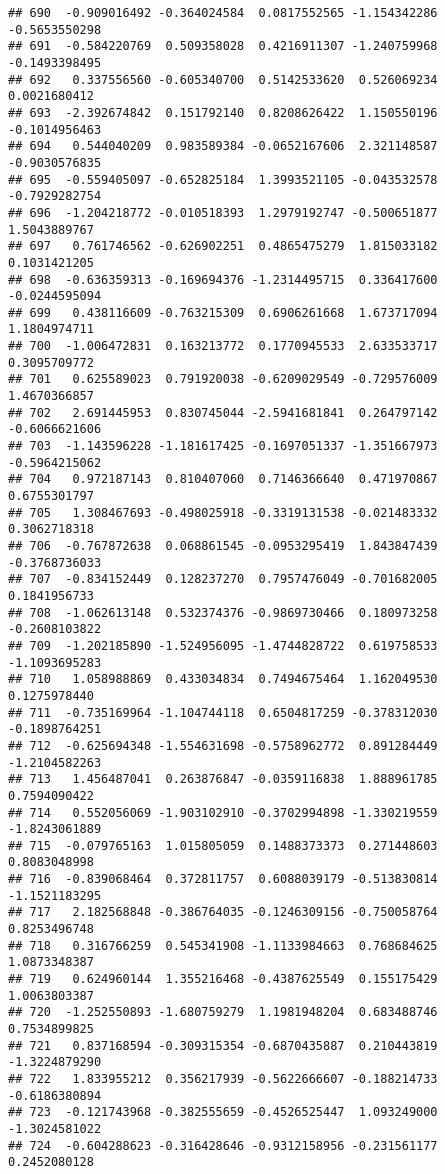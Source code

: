 \documentclass[
]{article}
\begin{document}
\begin{verbatim}
## 690  -0.909016492 -0.364024584  0.0817552565 -1.154342286 -0.5653550298
## 691  -0.584220769  0.509358028  0.4216911307 -1.240759968 -0.1493398495
## 692   0.337556560 -0.605340700  0.5142533620  0.526069234  0.0021680412
## 693  -2.392674842  0.151792140  0.8208626422  1.150550196 -0.1014956463
## 694   0.544040209  0.983589384 -0.0652167606  2.321148587 -0.9030576835
## 695  -0.559405097 -0.652825184  1.3993521105 -0.043532578 -0.7929282754
## 696  -1.204218772 -0.010518393  1.2979192747 -0.500651877  1.5043889767
## 697   0.761746562 -0.626902251  0.4865475279  1.815033182  0.1031421205
## 698  -0.636359313 -0.169694376 -1.2314495715  0.336417600 -0.0244595094
## 699   0.438116609 -0.763215309  0.6906261668  1.673717094  1.1804974711
## 700  -1.006472831  0.163213772  0.1770945533  2.633533717  0.3095709772
## 701   0.625589023  0.791920038 -0.6209029549 -0.729576009  1.4670366857
## 702   2.691445953  0.830745044 -2.5941681841  0.264797142 -0.6066621606
## 703  -1.143596228 -1.181617425 -0.1697051337 -1.351667973 -0.5964215062
## 704   0.972187143  0.810407060  0.7146366640  0.471970867  0.6755301797
## 705   1.308467693 -0.498025918 -0.3319131538 -0.021483332  0.3062718318
## 706  -0.767872638  0.068861545 -0.0953295419  1.843847439 -0.3768736033
## 707  -0.834152449  0.128237270  0.7957476049 -0.701682005  0.1841956733
## 708  -1.062613148  0.532374376 -0.9869730466  0.180973258 -0.2608103822
## 709  -1.202185890 -1.524956095 -1.4744828722  0.619758533 -1.1093695283
## 710   1.058988869  0.433034834  0.7494675464  1.162049530  0.1275978440
## 711  -0.735169964 -1.104744118  0.6504817259 -0.378312030 -0.1898764251
## 712  -0.625694348 -1.554631698 -0.5758962772  0.891284449 -1.2104582263
## 713   1.456487041  0.263876847 -0.0359116838  1.888961785  0.7594090422
## 714   0.552056069 -1.903102910 -0.3702994898 -1.330219559 -1.8243061889
## 715  -0.079765163  1.015805059  0.1488373373  0.271448603  0.8083048998
## 716  -0.839068464  0.372811757  0.6088039179 -0.513830814 -1.1521183295
## 717   2.182568848 -0.386764035 -0.1246309156 -0.750058764  0.8253496748
## 718   0.316766259  0.545341908 -1.1133984663  0.768684625  1.0873348387
## 719   0.624960144  1.355216468 -0.4387625549  0.155175429  1.0063803387
## 720  -1.252550893 -1.680759279  1.1981948204  0.683488746  0.7534899825
## 721   0.837168594 -0.309315354 -0.6870435887  0.210443819 -1.3224879290
## 722   1.833955212  0.356217939 -0.5622666607 -0.188214733 -0.6186380894
## 723  -0.121743968 -0.382555659 -0.4526525447  1.093249000 -1.3024581022
## 724  -0.604288623 -0.316428646 -0.9312158956 -0.231561177  0.2452080128

\end{verbatim}
\end{document}

